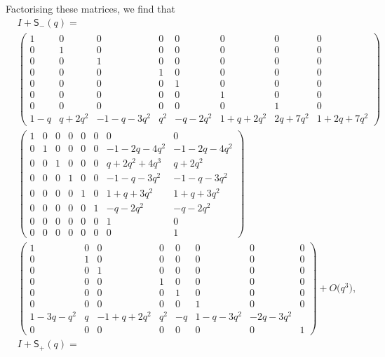 \documentclass[pdftex]{sigma}
\numberwithin{equation}{section}
\begin{document}
Factorising these matrices, we find that{\setlength{\arraycolsep}{1.5pt}
\begin{align*}
&I+\mathsf{S}_{-}(q) =\\
& \begin{pmatrix}
1 & 0 & 0 & 0 & 0 & 0 & 0 & 0\\
0 & 1 & 0 & 0 & 0 & 0 & 0 & 0\\
0 & 0 & 1 & 0 & 0 & 0 & 0 & 0\\
0 & 0 & 0 & 1 & 0 & 0 & 0 & 0\\
0 & 0 & 0 & 0 & 1 & 0 & 0 & 0\\
0 & 0 & 0 & 0 & 0 & 1 & 0 & 0\\
0 & 0 & 0 & 0 & 0 & 0 & 1 & 0\\
1\!-\!q & q\!+\!2q^2 & -1\!-\!q\!-\!3q^2 & q^2 & -q\!-\!2q^2 & 1\!+\!q\!+\!2q^2 & 2q\!+\!7q^2 & 1\!+\!2q\!+\!7q^2
\end{pmatrix}\\[-0.5mm]
&\begin{pmatrix}
1 & 0 & 0 & 0 & 0 & 0 & 0 & 0\\
0 & 1 & 0 & 0 & 0 & 0 & -1\!-\!2q\!-\!4q^2 & -1\!-\!2q\!-\!4q^2\\
0 & 0 & 1 & 0 & 0 & 0 & q\!+\!2q^2\!+\!4q^3 & q\!+\!2q^2\\
0 & 0 & 0 & 1 & 0 & 0 & -1\!-\!q\!-\!3q^2 & -1\!-\!q\!-\!3q^2\\
0 & 0 & 0 & 0 & 1 & 0 & 1\!+\!q\!+\!3q^2 & 1\!+\!q\!+\!3q^2\\
0 & 0 & 0 & 0 & 0 & 1 & -q\!-\!2q^2 & -q\!-\!2q^2\\
0 & 0 & 0 & 0 & 0 & 0 & 1 & 0\\
0 & 0 & 0 & 0 & 0 & 0 & 0 & 1
\end{pmatrix}\\[-0.5mm]
&\begin{pmatrix}
1 & 0 & 0 & 0 & 0 & 0 & 0 & 0\\
0 & 1 & 0 & 0 & 0 & 0 & 0 & 0\\
0 & 0 & 1 & 0 & 0 & 0 & 0 & 0\\
0 & 0 & 0 & 1 & 0 & 0 & 0 & 0\\
0 & 0 & 0 & 0 & 1 & 0 & 0 & 0\\
0 & 0 & 0 & 0 & 0 & 1 & 0 & 0\\
1\!-\!3q\!-\!q^2 & q & -1\!+\!q\!+\!2q^2 & q^2 & -q & 1\!-\!q\!-\!3q^2 & -2q\!-\!3q^2\\
0 & 0 & 0 & 0 & 0 & 0 & 0 & 1
\end{pmatrix}
+O\bigl(q^3\bigr) ,\\[-0.5mm]
&I+\mathsf{S}_{+}(q) =\\[-0.5mm]

\end{align*}}
\end{document}
